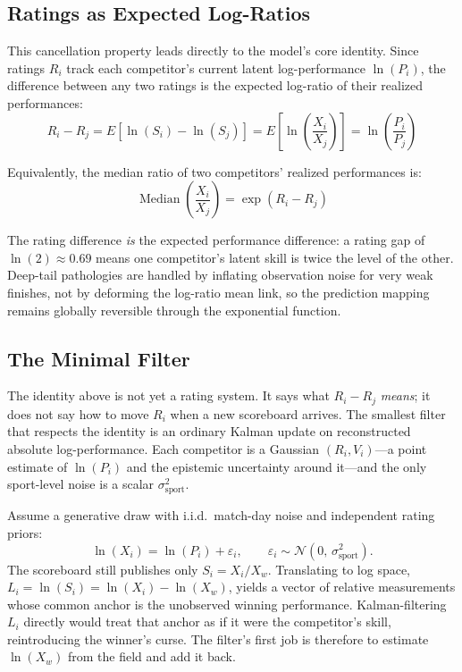 \documentclass[12pt]{article}
\newcommand{\ssport}{\sigma_{\mathrm{sport}}^2}      %
\newcommand{\xwin}{X_w}
\DeclareMathOperator*{\median}{Median}
\begin{document}
	\subsection{Ratings as Expected Log-Ratios}
	This cancellation property leads directly to the model's core identity. Since ratings $R_i$ track each competitor's current latent log-performance $\ln(P_i)$, the difference between any two ratings is the expected log-ratio of their realized performances:
	\begin{equation}
		R_i - R_j = E[\ln(S_i) - \ln(S_j)] = E\!\left[\ln\!\left(\frac{X_i}{X_j}\right)\right] = \ln\!\left(\frac{P_i}{P_j}\right)
	\end{equation}

	Equivalently, the median ratio of two competitors' realized performances is:
	\begin{equation}
		\median\!\left(\frac{X_i}{X_j}\right) = \exp(R_i - R_j)
	\end{equation}

	The rating difference \textit{is} the expected performance difference: a rating gap of $\ln(2) \approx 0.69$ means one competitor's latent skill is twice the level of the other. Deep-tail pathologies are handled by inflating observation noise for very weak finishes, not by deforming the log-ratio mean link, so the prediction mapping remains globally reversible through the exponential function.

	\subsection{The Minimal Filter}
	\label{sec:minimal}
	The identity above is not yet a rating system. It says what $R_i - R_j$ \emph{means}; it does not say how to move $R_i$ when a new scoreboard arrives. The smallest filter that respects the identity is an ordinary Kalman update on reconstructed absolute log-performance. Each competitor is a Gaussian $(R_i, V_i)$---a point estimate of $\ln(P_i)$ and the epistemic uncertainty around it---and the only sport-level noise is a scalar $\ssport$.

	Assume a generative draw with i.i.d.\ match-day noise and independent rating priors:
	\begin{equation}
		\ln(X_i) = \ln(P_i) + \varepsilon_i, \qquad \varepsilon_i \sim \mathcal{N}(0,\, \ssport).
	\end{equation}
	The scoreboard still publishes only $S_i = X_i / \xwin$. Translating to log space, $L_i = \ln(S_i) = \ln(X_i) - \ln(\xwin)$, yields a vector of relative measurements whose common anchor is the unobserved winning performance. Kalman-filtering $L_i$ directly would treat that anchor as if it were the competitor's skill, reintroducing the winner's curse. The filter's first job is therefore to estimate $\ln(\xwin)$ from the field and add it back.
\end{document}
